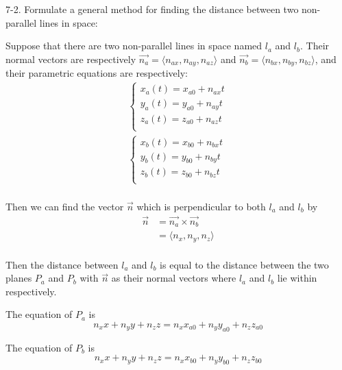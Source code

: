 \documentclass{article}
\begin{document}
7-2. Formulate a general method for finding the distance between two 
non-parallel lines in space:

Suppose that there are two non-parallel lines in space named $l_a$ and $l_b$. 
Their normal vectors are respectively 
$\vec{n_a} = \langle n_{ax}, n_{ay}, n_{az} \rangle$ and 
$\vec{n_b} = \langle n_{bx}, n_{by}, n_{bz} \rangle$, and their parametric 
equations are respectively:
\begin{gather*}
  \begin{cases}
    x_a(t) = x_{a0} + n_{ax}t \\
    y_a(t) = y_{a0} + n_{ay}t \\
    z_a(t) = z_{a0} + n_{az}t \\
  \end{cases} \\
  \begin{cases}
    x_b(t) = x_{b0} + n_{bx}t \\
    y_b(t) = y_{b0} + n_{by}t \\
    z_b(t) = z_{b0} + n_{bz}t \\
  \end{cases} \\
\end{gather*}

Then we can find the vector $\vec{n}$ which is perpendicular to both $l_a$ and 
$l_b$ by
\begin{equation*}
  \begin{split}
    \vec{n} &= \vec{n_a} \times \vec{n_b} \\
            &= \langle n_x, n_y, n_z \rangle \\
  \end{split}
\end{equation*}

Then the distance between $l_a$ and $l_b$ is equal to the distance between the 
two planes $P_a$ and $P_b$ with $\vec{n}$ as their normal vectors where $l_a$ 
and $l_b$ lie within respectively.

The equation of $P_a$ is
\begin{equation*}
  n_x x + n_y y + n_z z = n_x x_{a0} + n_y y_{a0} + n_z z_{a0}
\end{equation*}

The equation of $P_b$ is 
\begin{equation*}
  n_x x + n_y y + n_z z = n_x x_{b0} + n_y y_{b0} + n_z z_{b0}
\end{equation*}
\end{document}
